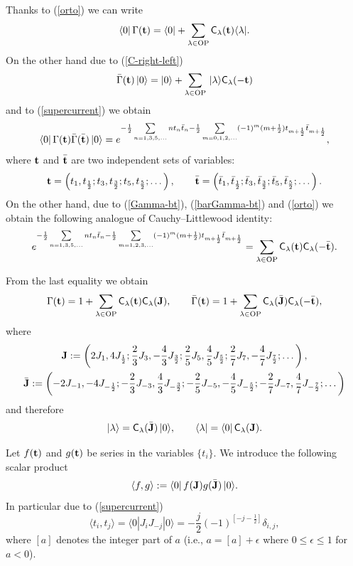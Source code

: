 \documentclass[pdftex]{sigma}
\numberwithin{equation}{section}
\newcommand{\C}{\textsf{C}_}
\newcommand{\G}{\Gamma}
\newcommand{\bt}{{\bf {t}}}
\renewcommand{\l}{\langle}
\renewcommand{\r}{\rangle}
\begin{document}
Thanks to (\ref{orto}) we can write
 \begin{gather}\label{left-coherent-state}
\l 0|\,{\G}({\bt}) = \l 0| + \sum_{\lambda\in \mathrm{OP}}
\textsf{C}_\lambda({\bt}) \l \lambda |.
 \end{gather}
On the other hand due to (\ref{C-right-left})
\[
{\bar\G}({\bt})\,|0\r = |0\r + \sum_{\lambda\in
\mathrm{OP}}\,|\lambda\r \textsf{C}_\lambda(-{\bt})
\]
and to (\ref{supercurrent}) we obtain
\[
\l 0|\,{\G}({\bt}){\bar\G}({\bar\bt})\,|0\r = e^{-\frac
12\sum\limits_{n=1,3,5,\dots} nt_n{\bar t}_n  -\frac 12
\sum\limits_{m=0,1,2,\dots } (-1)^{m}(m+\frac 12)t_{m+\frac 12}{\bar
t}_{m+\frac 12} },
\]
 where $\bt$ and ${\bar\bt}$ are two independent sets of
 variables:
  \[
{\bf t}=\left(t_1,t_{\frac 12};t_3,t_{\frac 32};t_5,t_{\frac
52};\dots \right) , \qquad {\bar\bt}=\left({\bar t}_1,{\bar
t}_{\frac 12};{\bar t}_3,{\bar t}_{\frac 32};{\bar t}_5,{\bar
t}_{\frac 52};\dots \right).
  \]
  On the other hand, due to (\ref{Gamma-bt}), (\ref{barGamma-bt})
and (\ref{orto})  we obtain the following analogue of Cauchy--Littlewood identity:
 \begin{gather}\label{CL-t}
e^{-\frac 12\sum\limits_{n=1,3,5,\dots}nt_n{\bar t}_n  -\frac 12
\sum\limits_{m=1,2,3,\dots }  (-1)^{m}(m+\frac 12)t_{m+\frac 12}{\bar
t}_{m+\frac 12} } = \sum_{\lambda\in
\mathrm{OP}} \textsf{C}_\lambda({\bt})  \textsf{C}_\lambda(-{\bar\bt}).
 \end{gather}

 From the last equality we obtain
\[
\G(\bt)=1+ \sum_{\lambda\in\mathrm{OP}} \textsf{C}_\lambda({\bt})
\textsf{C}_\lambda({\bf J}) ,\qquad
{\bar\G}(\bt)=1+ \sum_{\lambda\in\mathrm{OP}}  \C\lambda({\bar{\bf
J}})\textsf{C}_\lambda(-{\bar\bt}),
\]
 where
\begin{gather*}
 {\bf J}:=\left(2J_1,4J_{\frac 12};\frac 23 J_3,-\frac 43 J_{\frac 32};
 \frac 25 J_5,\frac 45 J_{\frac
 52};\frac 27 J_7,-\frac 47 J_{\frac 72};\dots\right) ,
\\
 {\bar{\bf J}}:=\left(-2J_{-1},-4 J_{-\frac 12};-\frac 23 J_{-3},
 \frac 43 J_{-\frac 32};-\frac 25 J_{-5},-\frac 45 J_{-\frac
 52};-\frac 27 J_{-7},
 \frac 47 J_{-\frac 72};\dots\right)
\end{gather*}
 and therefore
 \begin{gather}\label{b-state}
|\lambda\r =\textsf{C}_\lambda({\bar{\bf J}})\,|0\r ,\qquad \l
\lambda |=\l 0|\,\textsf{C}_\lambda({\bf J}).
 \end{gather}


Let $f(\bt)$ and $g(\bt)$ be series in the variables $\{t_i\}$. We
introduce the following scalar product
 \begin{gather}
\label{scalar-product}
 \l f , g\r : = \l 0|\,f({\bf J})
g({\bar{\bf J}})\,|0\r.
  \end{gather}
In particular due to (\ref{supercurrent})
\[
\l t_i, t_j\r = \l 0| J_{i}J_{-j} |0\r = -\frac j2
(-1)^{[-j-\frac 12]}\delta_{i,j},
\]
where $[a]$ denotes the integer part of $a$ (i.e.,
  $a=[a]+\epsilon$ where $0\le \epsilon \le 1$ for~$a<0$).
\end{document}
